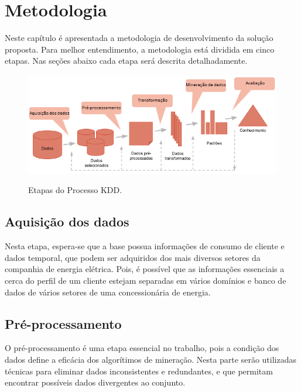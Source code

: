 \documentclass[../main.tex]{subfiles}
\begin{document}
\chapter{Metodologia}

Neste capítulo é apresentada a metodologia de desenvolvimento da solução proposta. Para melhor entendimento, a metodologia está dividida em cinco etapas. Nas seções abaixo cada etapa será descrita detalhadamente.

\begin{figure}[h]
\centering
\caption{Etapas do Processo KDD.}
\includegraphics[width=1\textwidth]{Images/kdd.png}
\label{fig:Digitos_analogicos}
\end{figure}
 
 
\section{Aquisição dos dados}

Nesta etapa, espera-se que a base possua informações de consumo de cliente e dados temporal, que podem ser adquiridos dos mais diversos setores da companhia de energia elétrica. Pois, é possível que as informações essenciais a cerca do perfil de um cliente estejam separadas em vários domínios e banco de dados de vários setores de uma concessionária de energia.


\section{Pré-processamento}
O pré-processamento é uma etapa essencial no trabalho, pois a condição dos dados define a eficácia dos algorítimos de mineração. Nesta parte serão utilizadas técnicas para eliminar dados inconsistentes e redundantes, e que permitam encontrar possíveis dados divergentes ao conjunto.
\end{document}
